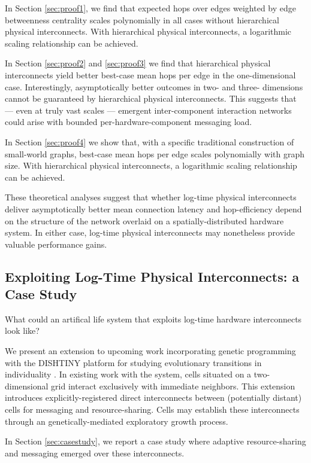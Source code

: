 In Section \ref{sec:proof1}, we find that expected hops over edges weighted by edge betweenness centrality scales polynomially in all cases without hierarchical physical interconnects.
With hierarchical physical interconnects, a logarithmic scaling relationship can be achieved.

In Section \ref{sec:proof2} and \ref{sec:proof3} we find that hierarchical physical interconnects yield better best-case mean hops per edge in the one-dimensional case.
Interestingly, asymptotically better outcomes in two- and three- dimensions cannot be guaranteed by hierarchical physical interconnects.
This suggests that --- even at truly vast scales --- emergent inter-component interaction networks could arise with bounded per-hardware-component messaging load.

In Section \ref{sec:proof4} we show that, with a specific traditional construction of small-world graphs, best-case mean hops per edge scales polynomially with graph size.
With hierarchical physical interconnects, a logarithmic scaling relationship can be achieved.

These theoretical analyses suggest that whether log-time physical interconnects deliver asymptotically better mean connection latency and hop-efficiency depend on the structure of the network overlaid on a spatially-distributed hardware system.
In either case, log-time physical interconnects may nonetheless provide valuable performance gains. %

\subsection{Exploiting Log-Time Physical Interconnects: a Case Study}

What could an artifical life system that exploits log-time hardware interconnects look like?

We present an extension to upcoming work incorporating genetic programming with the DISHTINY platform for studying evolutionary transitions in individuality \citep{moreno2019toward}.
In existing work with the system, cells situated on a two-dimensional grid interact exclusively with immediate neighbors.
This extension introduces explicitly-registered direct interconnects between (potentially distant) cells for messaging and resource-sharing.
Cells may establish these interconnects through an genetically-mediated exploratory growth process.

In Section \ref{sec:casestudy}, we report a case study where adaptive resource-sharing and messaging emerged over these interconnects.

